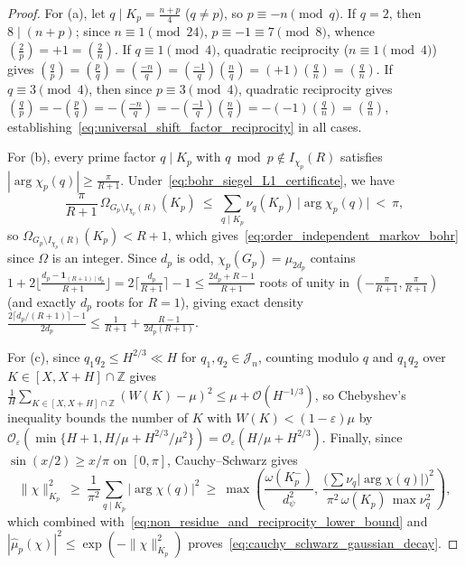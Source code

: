 \documentclass[11pt, a4paper]{article}
\theoremstyle{plain}
\theoremstyle{definition}
\newcommand{\Z}{\mathbb{Z}}
\newcommand{\leg}[2]{\left(\frac{#1}{#2}\right)}
\begin{document}
\begin{proof}
For (a), let $q\mid K_p=\frac{n+p}{4}$ ($q\neq p$), so $p\equiv-n\pmod q$. If $q=2$, then $8\mid(n+p)$; since $n\equiv1\pmod{24}$, $p\equiv-1\equiv7\pmod 8$, whence $\leg{2}{p}=+1=\leg{2}{n}$. If $q\equiv1\pmod 4$, quadratic reciprocity ($n\equiv1\pmod 4$) gives $\leg{q}{p}=\leg{p}{q}=\leg{-n}{q}=\leg{-1}{q}\leg{n}{q}=(+1)\leg{q}{n}=\leg{q}{n}$. If $q\equiv3\pmod 4$, then since $p\equiv3\pmod 4$, quadratic reciprocity gives $\leg{q}{p}=-\leg{p}{q}=-\leg{-n}{q}=-\leg{-1}{q}\leg{n}{q}=-(-1)\leg{q}{n}=\leg{q}{n}$, establishing~\eqref{eq:universal_shift_factor_reciprocity} in all cases.

For (b), every prime factor $q\mid K_p$ with $q\bmod p\notin I_{\chi_p}(R)$ satisfies $|\arg\chi_p(q)|\ge\frac{\pi}{R+1}$. Under~\eqref{eq:bohr_siegel_L1_certificate}, we have
\[
\frac{\pi}{R+1}\,\Omega_{G_p\setminus I_{\chi_p}(R)}(K_p)\ \le\ \sum_{q\mid K_p}\nu_q(K_p)\,\big|\arg\chi_p(q)\big|\ <\ \pi,
\]
so $\Omega_{G_p\setminus I_{\chi_p}(R)}(K_p)<R+1$, which gives~\eqref{eq:order_independent_markov_bohr} since $\Omega$ is an integer. Since $d_p$ is odd, $\chi_p(G_p)=\mu_{2d_p}$ contains $1+2\lfloor\frac{d_p-\mathbf{1}_{(R+1)\mid d_p}}{R+1}\rfloor=2\lceil\frac{d_p}{R+1}\rceil-1\le\frac{2d_p+R-1}{R+1}$ roots of unity in $(-\frac{\pi}{R+1},\frac{\pi}{R+1})$ (and exactly $d_p$ roots for $R=1$), giving exact density $\frac{2\lceil d_p/(R+1)\rceil-1}{2d_p}\le\frac{1}{R+1}+\frac{R-1}{2d_p(R+1)}$.

For (c), since $q_1q_2\le H^{2/3}\ll H$ for $q_1,q_2\in\mathcal{J}_n$, counting modulo $q$ and $q_1q_2$ over $K\in[X,X+H]\cap\Z$ gives $\frac1H\sum_{K\in[X,X+H]\cap\Z}(W(K)-\mu)^{2}\le\mu+\mathcal{O}(H^{-1/3})$, so Chebyshev's inequality bounds the number of $K$ with $W(K)<(1-\varepsilon)\mu$ by $\mathcal{O}_\varepsilon(\min\{H+1,H/\mu+H^{2/3}/\mu^{2}\})=\mathcal{O}_\varepsilon(H/\mu+H^{2/3})$. Finally, since $\sin(x/2)\ge x/\pi$ on $[0,\pi]$, Cauchy--Schwarz gives
\[
\|\chi\|_{K_p}^{2}\ \ge\ \frac{1}{\pi^{2}}\sum_{q\mid K_p}\big|\arg\chi(q)\big|^{2}\ \ge\ \max\!\left(\frac{\omega(K_p^{-})}{d_{\psi}^{2}},\ \frac{\big(\sum\nu_q|\arg\chi(q)|\big)^{2}}{\pi^{2}\,\omega(K_p)\,\max\nu_q^{2}}\right),
\]
which combined with~\eqref{eq:non_residue_and_reciprocity_lower_bound} and $|\widehat{\mu}_p(\chi)|^{2}\le\exp(-\|\chi\|_{K_p}^{2})$ proves~\eqref{eq:cauchy_schwarz_gaussian_decay}.
\end{proof}
\end{document}
